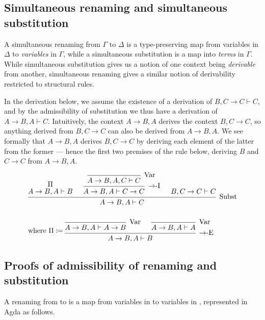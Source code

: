 \subsection{Simultaneous renaming and simultaneous substitution}

A simultaneous renaming from $\Gamma$ to $\Delta$ is a type-preserving map from
variables in $\Delta$ to \emph{variables} in $\Gamma$, while a simultaneous
substitution is a map into \emph{terms} in $\Gamma$.
While simultaneous substitution gives us a notion of one context being
\emph{derivable} from another, simultaneous renaming gives a similar notion
of derivability restricted to structural rules.

In the derivation below, we assume the existence of a derivation of
$B, C \to C \vdash C$, and by the admissibility of substitution we thus have a
derivation of $A \to B, A \vdash C$.
Intuitively, the context $A \to B, A$ derives the context $B, C \to C$, so
anything derived from $B, C \to C$ can also be derived from $A \to B, A$.
We see formally that $A \to B, A$ derives $B, C \to C$ by deriving each element
of the latter from the former --- hence the first two premises of the 
rule below, deriving $B$ and $C \to C$ from $A \to B, A$.

\begin{align*}
  &\begin{prooftree}
    \hypo{\Pi}
    \infer[no rule]1{A \to B, A \vdash B}
    \infer0[Var]{A \to B, A, C \vdash C}
    \infer1[$\to$-I]{A \to B, A \vdash C \to C}
    \hypo{B, C \to C \vdash C}
    \infer3[Subst]{A \to B, A \vdash C}
  \end{prooftree}
  \\\\
  &\textrm{where }\Pi \coloneqq
  \begin{prooftree}
    \infer0[Var]{A \to B, A \vdash A \to B}
    \infer0[Var]{A \to B, A \vdash A}
    \infer2[$\to$-E]{A \to B, A \vdash B}
  \end{prooftree}
\end{align*}

\subsection{Proofs of admissibility of renaming and substitution}

A renaming from \AgdaBound{$\Gamma$} to \AgdaBound{$\Delta$}
is a map from variables in \AgdaBound{$\Delta$} to variables in
\AgdaBound{$\Gamma$}, represented in Agda as follows.

